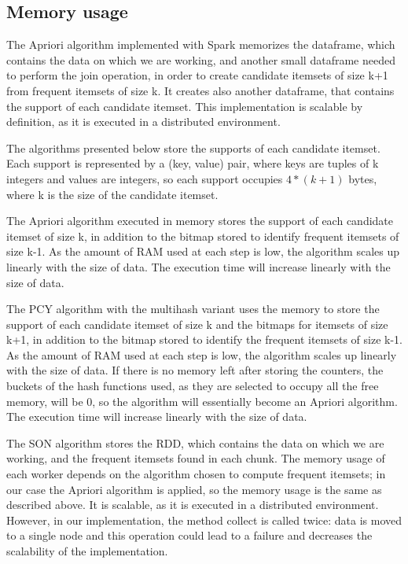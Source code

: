\documentclass[conference,compsoc]{IEEEtran}
\theoremstyle{definition}
\begin{document}
\subsection{Memory usage}

The Apriori algorithm implemented with Spark memorizes the dataframe, which contains the data on which we are working, and another small dataframe needed to perform the join operation, in order to create candidate itemsets of size k+1 from frequent itemsets of size k. It creates also another dataframe, that contains the support of each candidate itemset. This implementation is scalable by definition, as it is executed in a distributed environment.

The algorithms presented below store the supports of each candidate itemset. Each support is represented by a (key, value) pair, where keys are tuples of k integers and values are integers, so each support occupies \(4*(k+1)\) bytes, where k is the size of the candidate itemset.

The Apriori algorithm executed in memory stores the support of each candidate itemset of size k, in addition to the bitmap stored to identify frequent itemsets of size k-1. As the amount of RAM used at each step is low, the algorithm scales up linearly with the size of data. The execution time will increase linearly with the size of data. 

The PCY algorithm with the multihash variant uses the memory to store the support of each candidate itemset of size k and the bitmaps for itemsets of size k+1, in addition to the bitmap stored to identify the frequent itemsets of size k-1. As the amount of RAM used at each step is low, the algorithm scales up linearly with the size of data. If there is no memory left after storing the counters, the buckets of the hash functions used, as they are selected to occupy all the free memory, will be 0, so the algorithm will essentially become an Apriori algorithm. The execution time will increase linearly with the size of data.

The SON algorithm stores the RDD, which contains the data on which we are working, and the frequent itemsets found in each chunk. The memory usage of each worker depends on the algorithm chosen to compute frequent itemsets; in our case the Apriori algorithm is applied, so the memory usage is the same as described above. It is scalable, as it is executed in a distributed environment. However, in our implementation, the method collect is called twice: data is moved to a single node and this operation could lead to a failure and decreases the scalability of the implementation.
\end{document}
